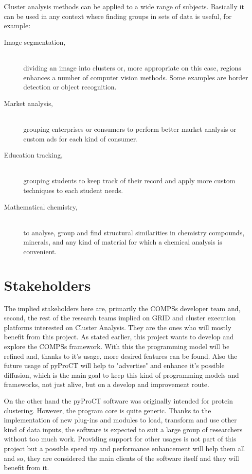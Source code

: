 Cluster analysis methods can be applied to a wide range of subjects. Basically it can be used in any context where finding groups in sets of data is useful, for example:

\begin{description}
\item [Image segmentation,] \hfill \\ dividing an image into clusters or, more appropriate on this case, regions enhances a number of computer vision methods. Some examples are border detection or object recognition. \cite{Ayech2015}
\item [Market analysis,] \hfill \\ grouping enterprises \cite{Burca2014} or consumers \cite{Muller2014} to perform better market analysis or custom ads for each kind of consumer.
\item [Education tracking,] \hfill \\ grouping students to keep track of their record and apply more custom techniques to each student needs. \cite{Chan2014}
\item [Mathematical chemistry,] \hfill \\ to analyse, group and find structural similarities in chemistry compounds, minerals, and any kind of material for which a chemical analysis is convenient. \cite{Cortes2007}
\end{description}


\section{Stakeholders}

The implied stakeholders here are, primarily the COMPSs developer team and, second, the rest of the research teams implied on GRID and cluster execution platforms interested on Cluster Analysis. They are the ones who will mostly benefit from this project. As stated earlier, this project wants to develop and explore the COMPSs framework. With this the programming model will be refined and, thanks to it's usage, more desired features can be found. Also the future usage of pyProCT will help to "advertise" and enhance it's possible diffusion, which is the main goal to keep this kind of programming models and frameworks, not just alive, but on a develop and improvement route.

On the other hand the pyProCT software was originally intended for protein clustering. However, the program core is quite generic. Thanks to the implementation of new plug-ins and modules to load, transform and use other kind of data inputs, the software is expected to suit a large group of researchers without too much work. Providing support for other usages is not part of this project but a possible speed up and performance enhancement will help them all and so, they are considered the main clients of the software itself and they will benefit from it.

